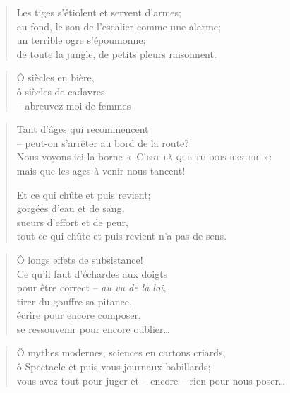   \begin{verse}
    Les tiges s’étiolent et servent d’armes;\\
    au fond, le son de l’escalier comme une alarme;\\
    un terrible ogre s’époumonne;\\
    de toute la jungle, de petits pleurs raisonnent.
  \end{verse}
\newpage
{}
  \begin{verse}
    Ô siècles en bière,\\
    ô siècles de cadavres\\
    -- abreuvez moi de femmes
  \end{verse}
  \begin{verse}
    Tant d’âges qui recommencent\\
    -- peut-on s’arrêter au bord de la route?\\
    Nous voyons ici la borne \textsc{«~C’est là que tu dois rester~»}:\\
    mais que les ages à venir nous tancent!

    Et ce qui chûte et puis revient;\\
    gorgées d’eau et de sang,\\
    sueurs d’effort et de peur,\\
    tout ce qui chûte et puis revient n’a pas de sens.
  \end{verse}
  \begin{verse}
    Ô longs effets de subsistance!\\
    Ce qu’il faut d’échardes aux doigts\\
    pour être correct -- \textit{au vu de la loi},\\
    tirer du gouffre sa pitance,\\
    écrire pour encore composer,\\
    se ressouvenir pour encore oublier…
  \end{verse}
  \begin{verse}
    Ô mythes modernes, sciences en cartons criards,\\
    ô Spectacle et puis vous journaux babillards;\\
    vous avez tout pour juger et -- encore -- rien pour nous poser…
  \end{verse}
